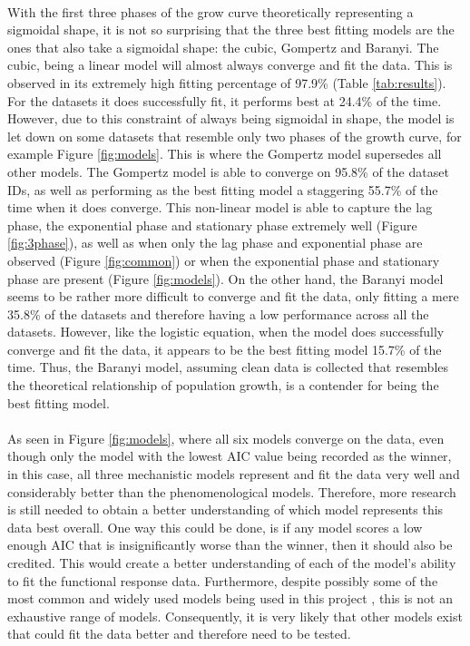 \documentclass[11pt, a4paper]{article} %
\begin{document}
\paragraph{} With the first three phases of the grow curve theoretically representing a sigmoidal shape, it is not so surprising that the three best fitting models are the ones that also take a sigmoidal shape: the cubic, Gompertz and Baranyi. The cubic, being a linear model will almost always converge and fit the data. This is observed in its extremely high fitting percentage of 97.9\% (Table \ref{tab:results}). For the datasets it does successfully fit, it performs best at 24.4\% of the time. However, due to this constraint of always being sigmoidal in shape, the model is let down on some datasets that resemble only two phases of the growth curve, for example Figure \ref{fig:models}. This is where the Gompertz model supersedes all other models. The Gompertz model is able to converge on 95.8\% of the dataset IDs, as well as performing as the best fitting model a staggering 55.7\% of the time when it does converge. This non-linear model is able to capture the lag phase, the exponential phase and stationary phase extremely well (Figure \ref{fig:3phase}), as well as when only the lag phase and exponential phase are observed (Figure \ref{fig:common}) or when the exponential phase and stationary phase are present (Figure \ref{fig:models}). On the other hand, the Baranyi model seems to be rather more difficult to converge and fit the data, only fitting a mere 35.8\% of the datasets and therefore having a low performance across all the datasets. However, like the logistic equation, when the model does successfully converge and fit the data, it appears to be the best fitting model 15.7\% of the time. Thus, the Baranyi model, assuming clean data is collected that resembles the theoretical relationship of population growth, is a contender for being the best fitting model. 

\paragraph{} As seen in Figure \ref{fig:models}, where all six models converge on the data, even though only the model with the lowest AIC value being recorded as the winner, in this case, all three mechanistic models represent and fit the data very well and considerably better than the phenomenological models. Therefore, more research is still needed to obtain a better understanding of which model represents this data best overall. One way this could be done, is if any model scores a low enough AIC that is insignificantly worse than the winner, then it should also be credited. This would create a better understanding of each of the model's ability to fit the functional response data. Furthermore, despite possibly some of the most common and widely used models being used in this project \citep{RN108, RN105}, this is not an exhaustive range of models. Consequently, it is very likely that other models exist that could fit the data better and therefore need to be tested.
\end{document}

